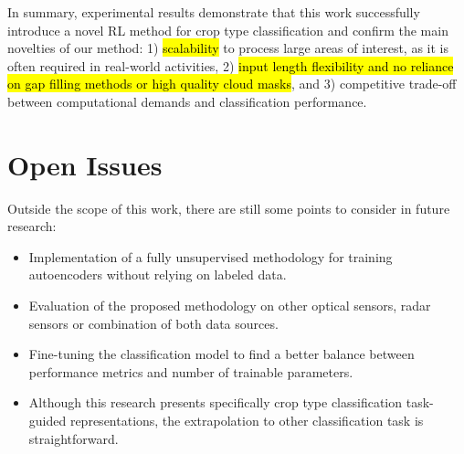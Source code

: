 \documentclass[journal,article,submit,pdftex,moreauthors]{Definitions/mdpi}
\begin{document}
In summary, experimental results demonstrate that this work successfully introduce a novel \ac{RL} method for crop type classification and confirm the main novelties of our method: 1) \hl{scalability} to process large areas of interest, as it is often required in real-world activities, 2) \hl{input length flexibility and no reliance on gap filling methods or high quality cloud masks}, and 3) competitive trade-off between computational demands and classification performance. 

\section{Open Issues}
Outside the scope of this work, there are still some points to consider in future research:
\begin{itemize}
	\item Implementation of a fully unsupervised methodology for training autoencoders without relying on labeled data.
	\item Evaluation of the proposed methodology on other optical sensors, radar sensors or combination of both data sources.
	\item Fine-tuning the classification model to find a better balance between performance metrics and number of trainable parameters.
    \item Although this research presents specifically crop type classification task-guided representations, the extrapolation to other classification task is straightforward.
\end{itemize}


\end{document}
